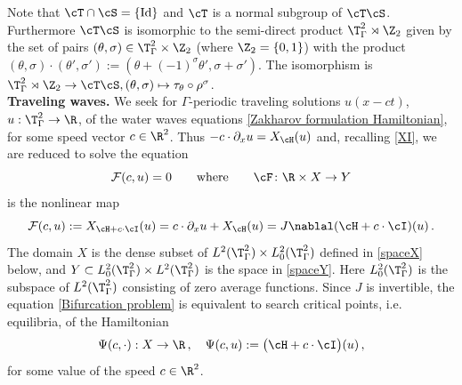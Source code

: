 \documentclass[11pt,a4paper,reqno]{article}
\numberwithin{equation}{section}
\theoremstyle{definition}
\begin{document}
Note that  $ \cT \cap \cS = \{\text{Id} \} $ and  $\cT  $ is a normal subgroup of $\cT  \cS  $.
Furthermore  $ \cT \cS $ is isomorphic to the semi-direct product $\T^2_\Gamma \rtimes \Z_2$ given by the set of pairs $(\theta,\sigma)\in \T^2_\Gamma\times \Z_2$ (where $\Z_2=\{0,1\}$) with the product $(\theta,\sigma)\cdot (\theta',\sigma') :=(\theta+(-1)^\sigma\theta',\sigma+\sigma')$.
The isomorphism  is  $\T_\Gamma^2\rtimes \Z_2\to \cT\cS, (\theta,\sigma)\mapsto \tau_\theta \circ \rho^\sigma$.
\\[1mm]
    \noindent
    {\bf Traveling waves.}
    We seek for  
    $\Gamma$-periodic traveling  solutions 
    $  u (x-ct) $, 
    $ u : \T^2_\Gamma \to \R $,
    of  the water waves equations \eqref{Zakharov formulation Hamiltonian},  
    for some speed vector $c\in \R^2$.
    Thus 
   $ -c\cdot \partial_x u  = X_\cH (u)  $ 
   and, recalling \eqref{XI}, 
   we are reduced to 
  solve  
the equation 
    \begin{equation}\label{Bifurcation problem}
        \mathcal{F}(c, u) = 0
        \qquad \text{where} \qquad    \cF\colon \R \times X \to 
 Y 
    \end{equation}
     is  the nonlinear map 
    \begin{equation}\label{spaziY}
        \mathcal{F}(c, u):=X_{\cH + c\cdot \cI}(u)=
    c\cdot \partial_x u + 
    X_{\cH}(u )=  J\nablal( \cH + c\cdot \cI)(u) \, .
    \end{equation}
    The domain $ X $ is the dense subset  
    of $  L^2( \T^2_\Gamma) \times L^2_0(\T^2_\Gamma)$ defined in \eqref{spaceX} below, and 
      $Y \subset L^2_0( \T^2_\Gamma) \times L^2( \T^2_\Gamma)$ is the space in \eqref{spaceY}. 
    Here $L^2_0(\T^2_\Gamma)  $ is the subspace of $L^2 (\T^2_\Gamma)$ consisting of  zero average functions. 
Since $ J$ is invertible, the equation \eqref{Bifurcation problem} is equivalent 
 to search 
 critical  points,
 i.e. equilibria, of 
 the Hamiltonian 
	\begin{equation}\label{Variational}
\Psi (c, \cdot ) : X \to \R \, , \quad 	
 \Psi (c, u ) := 
 \big( \cH + c \cdot \cI \big) (u) \, , 
	\end{equation}
for some value of the 
speed $ c \in \R^2 $. 
\end{document}
